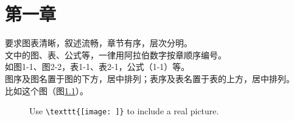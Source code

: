 \chapter{第一章}
要求图表清晰，叙述流畅，章节有序，层次分明。\\
文中的图、表、公式等，一律用阿拉伯数字按章顺序编号。\\
如图1-1、图2-2，表1-1、表2-1，公式（1-1）等。\\
图序及图名置于图的下方，居中排列；表序及表名置于表的上方，居中排列。\\

比如这个图（图\ref{fig:test}）。

\begin{figure}[tb]
Use \verb|\texttt{[image: ]}| to include a real picture.
\label{fig:test}
\end{figure}

